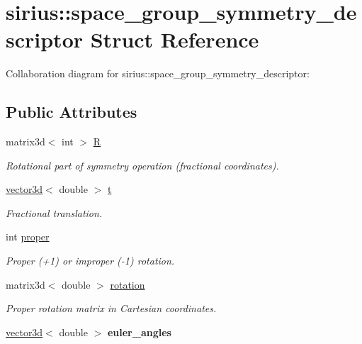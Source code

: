 \hypertarget{structsirius_1_1space__group__symmetry__descriptor}{}\section{sirius\+:\+:space\+\_\+group\+\_\+symmetry\+\_\+descriptor Struct Reference}
\label{structsirius_1_1space__group__symmetry__descriptor}


Collaboration diagram for sirius\+:\+:space\+\_\+group\+\_\+symmetry\+\_\+descriptor\+:
\subsection*{Public Attributes}
\begin{DoxyCompactItemize}
\item 
matrix3d$<$ int $>$ \hyperlink{structsirius_1_1space__group__symmetry__descriptor_afc69dbb8d30ba338514ad1185aa44edc}{R}
\begin{DoxyCompactList}\small\item\em Rotational part of symmetry operation (fractional coordinates). \end{DoxyCompactList}\item 
\hyperlink{classgeometry3d_1_1vector3d}{vector3d}$<$ double $>$ \hyperlink{structsirius_1_1space__group__symmetry__descriptor_a5c8edab1a7cf0333197091a12e0a2707}{t}
\begin{DoxyCompactList}\small\item\em Fractional translation. \end{DoxyCompactList}\item 
int \hyperlink{structsirius_1_1space__group__symmetry__descriptor_a50795c4d0bc499797b69b9386bc39724}{proper}
\begin{DoxyCompactList}\small\item\em Proper (+1) or improper (-\/1) rotation. \end{DoxyCompactList}\item 
matrix3d$<$ double $>$ \hyperlink{structsirius_1_1space__group__symmetry__descriptor_a6a3d9fcab0e0cceb5d8a8cba6c0cbbdc}{rotation}
\begin{DoxyCompactList}\small\item\em Proper rotation matrix in Cartesian coordinates. \end{DoxyCompactList}\item 
\hypertarget{structsirius_1_1space__group__symmetry__descriptor_ae0d7ea0066dbadbbf0c92a689eaf69dd}{}\hyperlink{classgeometry3d_1_1vector3d}{vector3d}$<$ double $>$ {\bfseries euler\+\_\+angles}\label{structsirius_1_1space__group__symmetry__descriptor_ae0d7ea0066dbadbbf0c92a689eaf69dd}

\end{DoxyCompactItemize}


